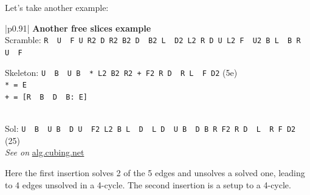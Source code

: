 \documentclass[11pt,a4paper]{book}
\newcommand{\p}{\textquotesingle}
\newcommand{\m}{\texttt}
\newcommand{\ps}{\p\,\,}
\begin{document}
Let's take another example:

\bigskip
\begin{tabular}{|p{}|}
\hline
\textbf{Another free slices example}\\
\hline
Scramble: \m{R\ps U\ps F U R2 D R2 B2 D\ps B2 L\ps D2 L2 R D U L2 F\ps U2 B L\ps B R\ps U\ps F}\\
\hline
\begin{minipage}[l]{0.650\textwidth}
Skeleton: \m{U\ps B\ps U B\ps * L2 B2 R2 + F2 R D\ps R L\ps F D2} (5e)\\
\m{* = E\ps}\\
\m{+ = [R\ps B\ps D\ps B: E]}
\end{minipage}
\begin{minipage}[c]{0.25\textwidth}

\end{minipage}\\
\hline
Sol: \m{U\ps B\ps U B\ps D U\ps F2 L2 B L\ps D\ps L D\ps U B\ps D B R F2 R D\ps L\ps R F D2} (25)\\
\hline
\emph{See on }\href{https://alg.cubing.net/?alg=U-_B-_U_B-_E-_L2_B2_R2_\%5BR-_B-_D-_B:_E\%5D_F2_R_D-_R_L-_F_D2&setup=R-_U-_F_U_R2_D_R2_B2_D-_B2_L-_D2_L2_R_D_U_L2_F-_U2_B_L-_B_R-_U-_F}{alg.cubing.net}\\
\hline
\end{tabular}
\bigskip

Here the first insertion solves 2 of the 5 edges and unsolves a solved one, leading to 4 edges unsolved in a 4-cycle. The second insertion is a setup to a 4-cycle.
\end{document}
